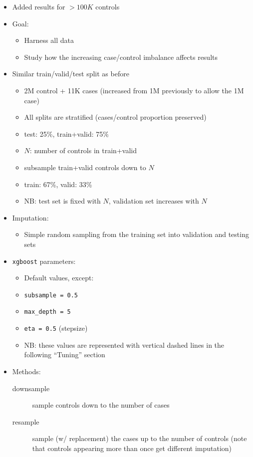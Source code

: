 \documentclass[12pt]{article}
\begin{document}
\begin{itemize}
	\item Added results for $>100K$ controls
	\item Goal:
	\begin{itemize}
		\item Harness all data
		\item Study how the increasing case/control imbalance affects results
	\end{itemize}
	\item Similar train/valid/test split as before
	\begin{itemize}
		\item 2M control + 11K cases (increased from 1M previously to allow the 1M case)
		\item All splits are stratified (cases/control proportion preserved)
		\item test: 25\%, train+valid: 75\%
		\item $N$: number of controls in train+valid
		\item subsample train+valid controls down to $N$
		\item train: 67\%, valid: 33\%
		\item NB: test set is fixed with $N$, validation set increases with $N$
	\end{itemize}
	\item Imputation:
	\begin{itemize}
		\item Simple random sampling from the training set into validation and testing sets
	\end{itemize}
	\item \texttt{xgboost} parameters:
	\begin{itemize}
		\item Default values, except:
		\item \texttt{subsample = 0.5}
		\item \texttt{max\_depth = 5}
		\item \texttt{eta = 0.5} (stepsize)
		\item NB: these values are represented with vertical dashed lines in the following ``Tuning'' section
	\end{itemize}
	\item Methods:
	\begin{description}
		\item[downsample] sample controls down to the number of cases
		\item[resample] sample (w/ replacement) the cases up to the number of controls (note that controls appearing more than once get different imputation)

\end{description}
\end{itemize}
\end{document}
